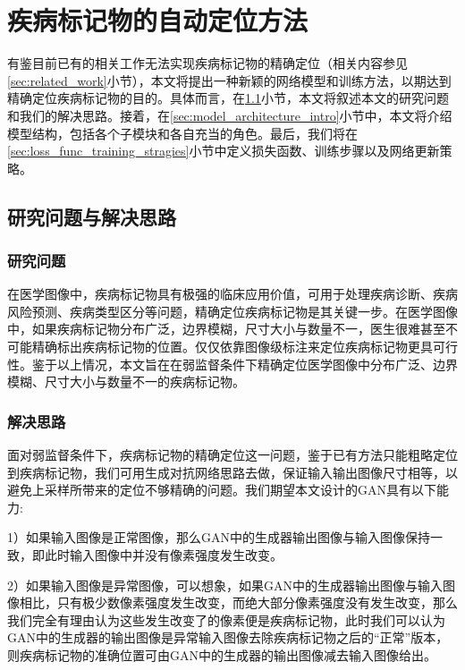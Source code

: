\chapter{疾病标记物的自动定位方法}\label{sec:method}
有鉴目前已有的相关工作无法实现疾病标记物的精确定位（相关内容参见\ref{sec:related_work}小节），本文将提出一种新颖的网络模型和训练方法，以期达到精确定位疾病标记物的目的。具体而言，在\ref{sec:idea_thinking}小节，本文将叙述本文的研究问题和我们的解决思路。接着，在\ref{sec:model_architecture_intro}小节中，本文将介绍模型结构，包括各个子模块和各自充当的角色。最后，我们将在\ref{sec:loss_func_training_stragies}小节中定义损失函数、训练步骤以及网络更新策略。

\section{研究问题与解决思路}\label{sec:idea_thinking}
\subsection{研究问题}
在医学图像中，疾病标记物具有极强的临床应用价值，可用于处理疾病诊断、疾病风险预测、疾病类型区分等问题，精确定位疾病标记物是其关键一步。在医学图像中，如果疾病标记物分布广泛，边界模糊，尺寸大小与数量不一，医生很难甚至不可能精确标出疾病标记物的位置。仅仅依靠图像级标注来定位疾病标记物更具可行性。鉴于以上情况，本文旨在在弱监督条件下精确定位医学图像中分布广泛、边界模糊、尺寸大小与数量不一的疾病标记物。
\subsection{解决思路}
面对弱监督条件下，疾病标记物的精确定位这一问题，鉴于已有方法只能粗略定位到疾病标记物，我们可用生成对抗网络思路去做，保证输入输出图像尺寸相等，以避免上采样所带来的定位不够精确的问题。我们期望本文设计的GAN具有以下能力:

1）如果输入图像是正常图像，那么GAN中的生成器输出图像与输入图像保持一致，即此时输入图像中并没有像素强度发生改变。
	
2）如果输入图像是异常图像，可以想象，如果GAN中的生成器输出图像与输入图像相比，只有极少数像素强度发生改变，而绝大部分像素强度没有发生改变，那么我们完全有理由认为这些发生改变了的像素便是疾病标记物，此时我们可以认为GAN中的生成器的输出图像是异常输入图像去除疾病标记物之后的“正常”版本，则疾病标记物的准确位置可由GAN中的生成器的输出图像减去输入图像给出。


